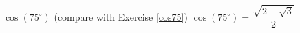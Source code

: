 {$\cos(75^{\circ})$  (compare with Exercise \ref{cos75})}
{$\cos(75^{\circ}) = \dfrac{\sqrt{2-\sqrt{3}}}{2}$ }
